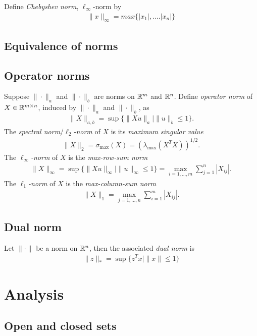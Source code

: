 Define \textit{Chebyshev norm}, $\ell_\infty$-norm by
\begin{align*}
  \|x\|_\infty=max\{|x_1|,\dots.|x_n|\}
\end{align*}

\subsection{Equivalence of norms}

\subsection{Operator norms}
Suppose $\|\cdot\|_a$ and $\|\cdot\|_b$ are norms on $\mathbb{R}^m$ and $\mathbb{R}^n$.
Define \textit{operator norm} of $X\in\mathbb{R}^{m\times n}$, induced by $\|\cdot\|_a$ and $\|\cdot\|_b$, as
\begin{align*}
  \|X\|_{a,b}=\sup\{\|Xu\|_a\mid\|u\|_b\le 1\}.
\end{align*}
The \textit{spectral norm}/$\ell_2$\textit{-norm} of $X$ is its \textit{maximum singular value}
\begin{align*}
  \|X\|_2=\sigma_\text{max}(X)=(\lambda_\text{max}(X^TX))^{1/2}.
\end{align*}
The $\ell_\infty$\textit{-norm} of $X$ is the \textit{max-row-sum norm}
\begin{align*}
  \|X\|_\infty=\sup\{\|Xu\|_\infty\mid\|u\|_\infty\le 1\}=\max_{i=1,\dots,m}\sum_{j=1}^n|X_{ij}|.
\end{align*}
The $\ell_1$\textit{-norm} of $X$ is the \textit{max-column-sum norm}
\begin{align*}
  \|X\|_1=\max_{j=1,\dots,n}\sum_{i=1}^m|X_{ij}|.
\end{align*}

\subsection{Dual norm}
Let $\|\cdot\|$ be a norm on $\mathbb{R}^n$, then the associated \textit{dual norm} is
\begin{align*}
  \|z\|_\ast=\sup\{z^Tx\mid\|x\|\le 1\}
\end{align*}

\section{Analysis}

\subsection{Open and closed sets}

